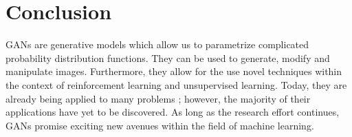 \documentclass[11pt]{article}
\begin{document}
\section{Conclusion}
GANs are generative models which allow us to parametrize complicated probability distribution functions. They can be used to generate, modify and manipulate images. Furthermore, they allow for the use novel techniques within the context of reinforcement learning and unsupervised learning. Today, they are already being applied to many problems \citep{genmodelingopenai}; however, the majority of their applications have yet to be discovered. As long as the research effort continues, GANs promise exciting new avenues within the field of machine learning.



\end{document}
